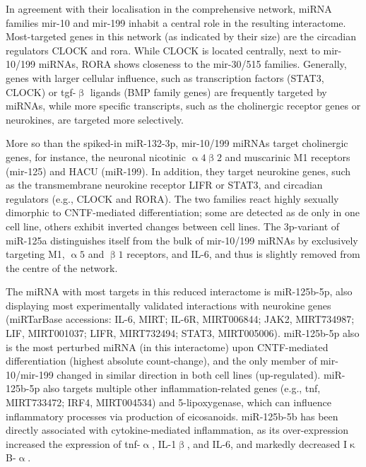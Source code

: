 In agreement with their localisation in the comprehensive network, miRNA families mir-10 and mir-199 inhabit a central role in the resulting interactome. Most-targeted genes in this network (as indicated by their size) are the circadian regulators CLOCK and \acs{rora}. While CLOCK is located centrally, next to mir-10/199 miRNAs, RORA shows closeness to the mir-30/515 families. Generally, genes with larger cellular influence, such as transcription factors (STAT3, CLOCK) or \ac{tgf}-$\upbeta$ ligands (BMP family genes) are frequently targeted by miRNAs, while more specific transcripts, such as the cholinergic receptor genes or neurokines, are targeted more selectively. 

More so than the spiked-in miR-132-3p, mir-10/199 miRNAs target cholinergic genes, for instance, the neuronal nicotinic $\upalpha4\upbeta2$ and muscarinic M1 receptors (mir-125) and HACU (miR-199). In addition, they target neurokine genes, such as the transmembrane neurokine receptor LIFR or STAT3, and circadian regulators (e.g., CLOCK and RORA). The two families react highly sexually dimorphic to CNTF-mediated differentiation; some are detected as \ac{de} only in one cell line, others exhibit inverted changes between cell lines. The 3p-variant of miR-125a distinguishes itself from the bulk of mir-10/199 miRNAs by exclusively targeting M1, $\upalpha5$ and $\upbeta1$ receptors, and IL-6, and thus is slightly removed from the centre of the network.

The miRNA with most targets in this reduced interactome is miR-125b-5p, also displaying most experimentally validated interactions with neurokine genes (miRTarBase accessions: IL-6, MIRT; IL-6R, MIRT006844; JAK2, MIRT734987; LIF, MIRT001037; LIFR, MIRT732494; \linebreak STAT3, MIRT005006). miR-125b-5p also is the most perturbed miRNA (in this interactome) upon CNTF-mediated differentiation (highest absolute count-change), and the only member of mir-10/mir-199 changed in similar direction in both cell lines (up-regulated). miR-125b-5p also targets multiple other inflammation-related genes (e.g., \ac{tnf}, MIRT733472; IRF4, MIRT004534) and 5-lipoxygenase, which can influence inflammatory processes via production of eicosanoids.\cite{Busch2015} miR-125b-5b has been directly associated with cytokine-mediated inflammation, as its over-expression increased the expression of \ac{tnf}-$\upalpha$, IL-1$\upbeta$, and IL-6, and markedly decreased I$\upkappa$B-$\upalpha$.\cite{Zhang2017}


